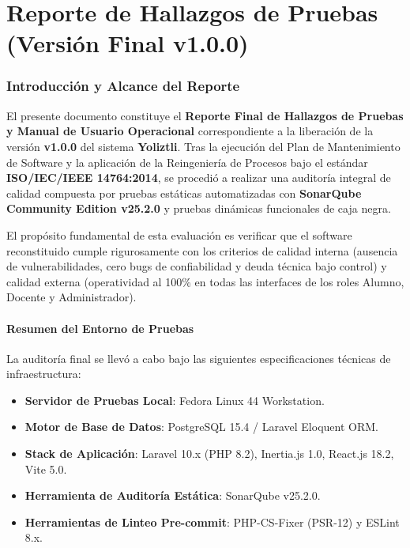 \documentclass[12pt]{article}
\begin{document}


\newpage
{
\hypersetup{linkcolor=black}
\tableofcontents
}
\newpage

\part{Reporte de Hallazgos de Pruebas (Versión Final v1.0.0)}

\section{Introducción y Alcance del Reporte}

El presente documento constituye el \textbf{Reporte Final de Hallazgos de Pruebas y Manual de Usuario Operacional} correspondiente a la liberación de la versión \textbf{v1.0.0} del sistema \textbf{Yoliztli}. Tras la ejecución del Plan de Mantenimiento de Software y la aplicación de la Reingeniería de Procesos bajo el estándar \textbf{ISO/IEC/IEEE 14764:2014}, se procedió a realizar una auditoría integral de calidad compuesta por pruebas estáticas automatizadas con \textbf{SonarQube Community Edition v25.2.0} y pruebas dinámicas funcionales de caja negra.

El propósito fundamental de esta evaluación es verificar que el software reconstituido cumple rigurosamente con los criterios de calidad interna (ausencia de vulnerabilidades, cero bugs de confiabilidad y deuda técnica bajo control) y calidad externa (operatividad al 100\% en todas las interfaces de los roles Alumno, Docente y Administrador).

\subsection{Resumen del Entorno de Pruebas}
La auditoría final se llevó a cabo bajo las siguientes especificaciones técnicas de infraestructura:
\begin{itemize}
    \item \textbf{Servidor de Pruebas Local}: Fedora Linux 44 Workstation.
    \item \textbf{Motor de Base de Datos}: PostgreSQL 15.4 / Laravel Eloquent ORM.
    \item \textbf{Stack de Aplicación}: Laravel 10.x (PHP 8.2), Inertia.js 1.0, React.js 18.2, Vite 5.0.
    \item \textbf{Herramienta de Auditoría Estática}: SonarQube v25.2.0.
    \item \textbf{Herramientas de Linteo Pre-commit}: PHP-CS-Fixer (PSR-12) y ESLint 8.x.
\end{itemize}
\end{document}
